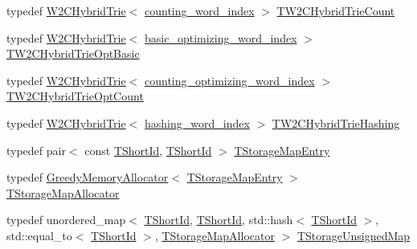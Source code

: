 \begin{DoxyCompactItemize}
\item 
typedef \hyperlink{classuva_1_1smt_1_1bpbd_1_1server_1_1lm_1_1_w2_c_hybrid_trie}{W2\+C\+Hybrid\+Trie}$<$ \hyperlink{classuva_1_1smt_1_1bpbd_1_1server_1_1lm_1_1dictionary_1_1counting__word__index}{counting\+\_\+word\+\_\+index} $>$ \hyperlink{namespaceuva_1_1smt_1_1bpbd_1_1server_1_1lm_a0e46e4f0c25b1f6e07cbb2854f69beb8}{T\+W2\+C\+Hybrid\+Trie\+Count}
\item 
typedef \hyperlink{classuva_1_1smt_1_1bpbd_1_1server_1_1lm_1_1_w2_c_hybrid_trie}{W2\+C\+Hybrid\+Trie}$<$ \hyperlink{namespaceuva_1_1smt_1_1bpbd_1_1server_1_1lm_1_1dictionary_a3001583c904eec702b4a4125082a7ecd}{basic\+\_\+optimizing\+\_\+word\+\_\+index} $>$ \hyperlink{namespaceuva_1_1smt_1_1bpbd_1_1server_1_1lm_a092da1a25cd6887e951a66d3f4983b51}{T\+W2\+C\+Hybrid\+Trie\+Opt\+Basic}
\item 
typedef \hyperlink{classuva_1_1smt_1_1bpbd_1_1server_1_1lm_1_1_w2_c_hybrid_trie}{W2\+C\+Hybrid\+Trie}$<$ \hyperlink{namespaceuva_1_1smt_1_1bpbd_1_1server_1_1lm_1_1dictionary_a61cbd647b15de785ccf4cdd26661c366}{counting\+\_\+optimizing\+\_\+word\+\_\+index} $>$ \hyperlink{namespaceuva_1_1smt_1_1bpbd_1_1server_1_1lm_a5f23b61f755456ea49e9ec0eed15eb93}{T\+W2\+C\+Hybrid\+Trie\+Opt\+Count}
\item 
typedef \hyperlink{classuva_1_1smt_1_1bpbd_1_1server_1_1lm_1_1_w2_c_hybrid_trie}{W2\+C\+Hybrid\+Trie}$<$ \hyperlink{classuva_1_1smt_1_1bpbd_1_1server_1_1lm_1_1dictionary_1_1hashing__word__index}{hashing\+\_\+word\+\_\+index} $>$ \hyperlink{namespaceuva_1_1smt_1_1bpbd_1_1server_1_1lm_aa2818fd447c1e13a07ae1c4e43bac187}{T\+W2\+C\+Hybrid\+Trie\+Hashing}
\item 
typedef pair$<$ const \hyperlink{namespaceuva_1_1smt_1_1bpbd_1_1server_1_1lm_1_1identifiers_a33043a191e9a637dea742a89d23c8bdc}{T\+Short\+Id}, \hyperlink{namespaceuva_1_1smt_1_1bpbd_1_1server_1_1lm_1_1identifiers_a33043a191e9a637dea742a89d23c8bdc}{T\+Short\+Id} $>$ \hyperlink{namespaceuva_1_1smt_1_1bpbd_1_1server_1_1lm_af9753207e699d2eca15673a50653797e}{T\+Storage\+Map\+Entry}
\item 
typedef \hyperlink{classuva_1_1utils_1_1containers_1_1alloc_1_1_greedy_memory_allocator}{Greedy\+Memory\+Allocator}$<$ \hyperlink{namespaceuva_1_1smt_1_1bpbd_1_1server_1_1lm_af9753207e699d2eca15673a50653797e}{T\+Storage\+Map\+Entry} $>$ \hyperlink{namespaceuva_1_1smt_1_1bpbd_1_1server_1_1lm_ab3c8b0f5a97fd6cd90d9fdb8bb2335c1}{T\+Storage\+Map\+Allocator}
\item 
typedef unordered\+\_\+map$<$ \hyperlink{namespaceuva_1_1smt_1_1bpbd_1_1server_1_1lm_1_1identifiers_a33043a191e9a637dea742a89d23c8bdc}{T\+Short\+Id}, \hyperlink{namespaceuva_1_1smt_1_1bpbd_1_1server_1_1lm_1_1identifiers_a33043a191e9a637dea742a89d23c8bdc}{T\+Short\+Id}, std\+::hash$<$ \hyperlink{namespaceuva_1_1smt_1_1bpbd_1_1server_1_1lm_1_1identifiers_a33043a191e9a637dea742a89d23c8bdc}{T\+Short\+Id} $>$, std\+::equal\+\_\+to$<$ \hyperlink{namespaceuva_1_1smt_1_1bpbd_1_1server_1_1lm_1_1identifiers_a33043a191e9a637dea742a89d23c8bdc}{T\+Short\+Id} $>$, \hyperlink{namespaceuva_1_1smt_1_1bpbd_1_1server_1_1lm_ab3c8b0f5a97fd6cd90d9fdb8bb2335c1}{T\+Storage\+Map\+Allocator} $>$ \hyperlink{namespaceuva_1_1smt_1_1bpbd_1_1server_1_1lm_a26bc64a9a6f92c48c443c82b33035e60}{T\+Storage\+Unsigned\+Map}

\end{DoxyCompactItemize}
